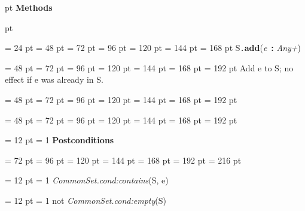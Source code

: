 {{{\par \pagebreak[3]  pt \noindent
{\Large {\bf Methods\/}}\par {} pt
} \noindent
\par}
{\par \noindent  \leftskip = 24 pt  \leftmargini = 48 pt  \leftmarginii = 72 pt  \leftmarginiii = 96 pt  \leftmarginiv = 120 pt  \leftmarginv = 144 pt  \leftmarginvi = 168 pt S{\tt .\/}{\bf {\large {\bf add\/}}\/}({\em e\/}~{\bf :}  {\em Any+\/}){\par \noindent
{\par \noindent  \leftskip = 48 pt  \leftmargini = 72 pt  \leftmarginii = 96 pt  \leftmarginiii = 120 pt  \leftmarginiv = 144 pt  \leftmarginv = 168 pt  \leftmarginvi = 192 pt  Add e to S; no effect if e was already in S.\par}
{\par \noindent  \leftskip = 48 pt  \leftmargini = 72 pt  \leftmarginii = 96 pt  \leftmarginiii = 120 pt  \leftmarginiv = 144 pt  \leftmarginv = 168 pt  \leftmarginvi = 192 pt {\par \noindent
\par}
\par}
{\par \noindent  \leftskip = 48 pt  \leftmargini = 72 pt  \leftmarginii = 96 pt  \leftmarginiii = 120 pt  \leftmarginiv = 144 pt  \leftmarginv = 168 pt  \leftmarginvi = 192 pt {\par \noindent
{\par \pagebreak[3.100000] \noindent \hangindent = 12 pt \hangafter = 1 
{\bf Postconditions\/}\par}
{\par \noindent  \leftskip = 72 pt  \leftmargini = 96 pt  \leftmarginii = 120 pt  \leftmarginiii = 144 pt  \leftmarginiv = 168 pt  \leftmarginv = 192 pt  \leftmarginvi = 216 pt {\par \noindent
{\par \pagebreak[3.000000] \noindent \hangindent = 12 pt \hangafter = 1 
 {\em CommonSet.cond:contains\/}(S, e)\par}
{\par \pagebreak[3.000000] \noindent \hangindent = 12 pt \hangafter = 1 
not  {\em CommonSet.cond:empty\/}(S)\par}
\par}
\par}
\par}
\par}
\par}
\par}
}
